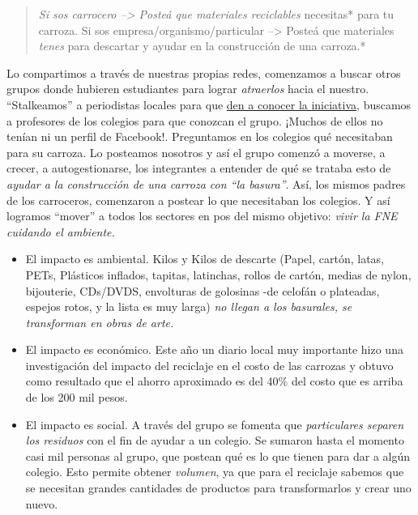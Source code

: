\documentclass[]{article}
\begin{document}
\begin{quote}
\emph{Si sos carrocero --\textgreater{} Posteá que materiales
reciclables }necesitas* para tu carroza.\emph{ }Si sos
empresa/organismo/particular --\textgreater{} Posteá que materiales
\emph{tenes} para descartar y ayudar en la construcción de una carroza.*
\end{quote}

Lo compartimos a través de nuestras propias redes, comenzamos a buscar
otros grupos donde hubieren estudiantes para lograr \emph{atraerlos}
hacia el nuestro. ``Stalkeamos'' a periodistas locales para que
\href{https://www.eltribuno.com/jujuy/nota/2018-8-12-20-14-0-impulsan-el-uso-de-reciclado-en-carrozas}{den
a conocer la iniciativa}, buscamos a profesores de los colegios para que
conozcan el grupo. ¡Muchos de ellos no tenían ni un perfil de Facebook!.
Preguntamos en los colegios qué necesitaban para su carroza. Lo
posteamos nosotros y así el grupo comenzó a moverse, a crecer, a
autogestionarse, los integrantes a entender de qué se trataba esto de
\emph{ayudar a la construcción de una carroza con ``la basura''}. Así,
los mismos padres de los carroceros, comenzaron a postear lo que
necesitaban los colegios. Y así logramos ``mover'' a todos los sectores
en pos del mismo objetivo: \emph{vivir la FNE cuidando el ambiente.}

\begin{itemize}
\item
  El impacto es ambiental. Kilos y Kilos de descarte (Papel, cartón,
  latas, PETs, Plásticos inflados, tapitas, latinchas, rollos de cartón,
  medias de nylon, bijouterie, CDs/DVDS, envolturas de golosinas -de
  celofán o plateadas, espejos rotos, y la lista es muy larga) \emph{no
  llegan a los basurales, se transforman en obras de arte.}
\item
  El impacto es económico. Este año un diario local muy importante hizo
  una investigación del impacto del reciclaje en el costo de las
  carrozas y obtuvo como resultado que el ahorro aproximado es del 40\%
  del costo que es arriba de los 200 mil pesos.
\item
  El impacto es social. A través del grupo se fomenta que
  \emph{particulares separen los residuos} con el fin de ayudar a un
  colegio. Se sumaron hasta el momento casi mil personas al grupo, que
  postean qué es lo que tienen para dar a algún colegio. Esto permite
  obtener \emph{volumen}, ya que para el reciclaje sabemos que se
  necesitan grandes cantidades de productos para transformarlos y crear
  uno nuevo.
\end{itemize}
\end{document}
